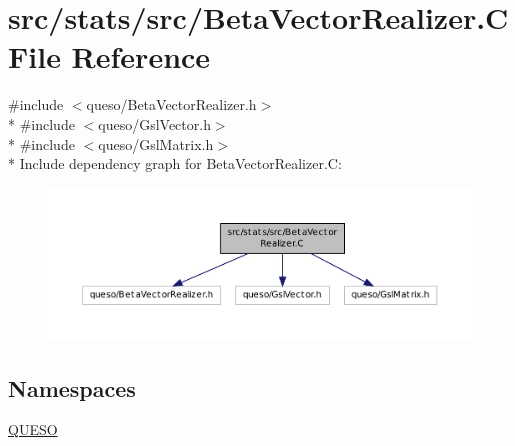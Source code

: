 \hypertarget{_beta_vector_realizer_8_c}{\section{src/stats/src/\-Beta\-Vector\-Realizer.C File Reference}
\label{_beta_vector_realizer_8_c}
}
{\ttfamily \#include $<$queso/\-Beta\-Vector\-Realizer.\-h$>$}\\*
{\ttfamily \#include $<$queso/\-Gsl\-Vector.\-h$>$}\\*
{\ttfamily \#include $<$queso/\-Gsl\-Matrix.\-h$>$}\\*
Include dependency graph for Beta\-Vector\-Realizer.\-C\-:
\nopagebreak
\begin{figure}[H]
\begin{center}
\leavevmode
\includegraphics[width=350pt]{_beta_vector_realizer_8_c__incl}
\end{center}
\end{figure}
\subsection*{Namespaces}
\begin{DoxyCompactItemize}
\item 
\hyperlink{namespace_q_u_e_s_o}{Q\-U\-E\-S\-O}
\end{DoxyCompactItemize}
